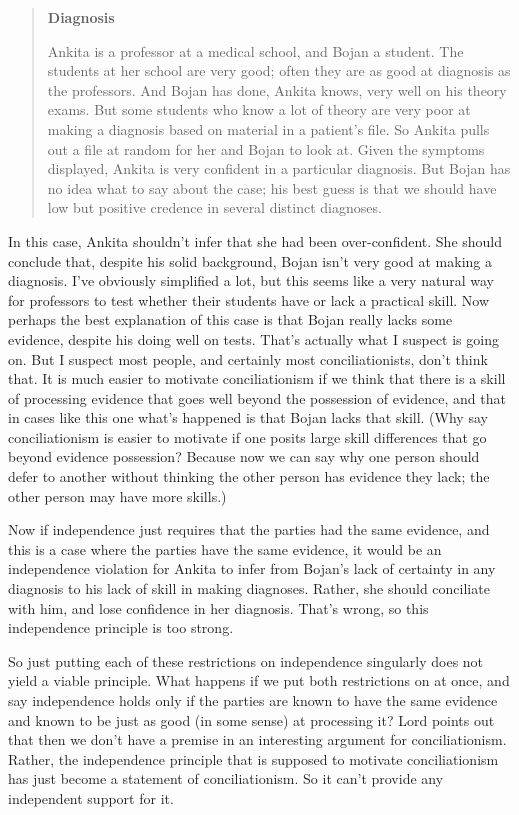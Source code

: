 \begin{quote}
\textbf{Diagnosis}

\gls{Ankita} is a professor at a medical school, and \gls{Bojan} a student. The students at her school are very good; often they are as good at diagnosis as the professors. And \gls{Bojan} has done, \gls{Ankita} knows, very well on his theory exams. But some students who know a lot of theory are very poor at making a diagnosis based on material in a patient's file. So \gls{Ankita} pulls out a file at random for her and \gls{Bojan} to look at. Given the symptoms displayed, \gls{Ankita} is very confident in a particular diagnosis. But \gls{Bojan} has no idea what to say about the case; his best guess is that we should have low but positive credence in several distinct diagnoses.
\end{quote}
In this case, \gls{Ankita} shouldn't infer that she had been over-confident. She should conclude that, despite his solid background, \gls{Bojan} isn't very good at making a diagnosis. I've obviously simplified a lot, but this seems like a very natural way for professors to test whether their students have or lack a practical skill. Now perhaps the best explanation of this case is that \gls{Bojan} really lacks some evidence, despite his doing well on tests. That's actually what I suspect is going on. But I suspect most people, and certainly most conciliationists, don't think that. It is much easier to motivate conciliationism if we think that there is a skill of processing evidence that goes well beyond the possession of evidence, and that in cases like this one what's happened is that \gls{Bojan} lacks that skill. (Why say conciliationism is easier to motivate if one posits large skill differences that go beyond evidence possession? Because now we can say why one person should defer to another without thinking the other person has evidence they lack; the other person may have more skills.)

Now if independence just requires that the parties had the same evidence, and this is a case where the parties have the same evidence, it would be an independence violation for \gls{Ankita} to infer from \gls{Bojan}'s lack of certainty in any diagnosis to his lack of skill in making diagnoses. Rather, she should conciliate with him, and lose confidence in her diagnosis. That's wrong, so this independence principle is too strong.

So just putting each of these restrictions on independence singularly does not yield a viable principle. What happens if we put both restrictions on at once, and say independence holds only if the parties are known to have the same evidence and known to be just as good (in some sense) at processing it? Lord points out that then we don't have a premise in an interesting argument for conciliationism. Rather, the independence principle that is supposed to motivate conciliationism has just become a statement of conciliationism. So it can't provide any independent support for it.

